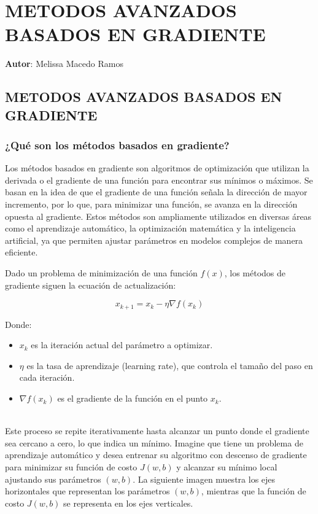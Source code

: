\documentclass{article}
\begin{document}
	\chapter{METODOS AVANZADOS BASADOS EN GRADIENTE}
	\textbf{Autor}: \large{Melissa Macedo Ramos}
	\label{chap:4}
	
	\vspace{1cm} 
	
	\section{METODOS AVANZADOS BASADOS EN GRADIENTE}
	
	\subsection{¿Qué son los métodos basados en gradiente?}
	
	Los métodos basados en gradiente son algoritmos de optimización que utilizan la derivada o el gradiente de una función para encontrar sus mínimos o máximos. Se basan en la idea de que el gradiente de una función señala la dirección de mayor incremento, por lo que, para minimizar una función, se avanza en la dirección opuesta al gradiente. Estos métodos son ampliamente utilizados en diversas áreas como el aprendizaje automático, la optimización matemática y la inteligencia artificial, ya que permiten ajustar parámetros en modelos complejos de manera eficiente.
	
	Dado un problema de minimización de una función \( f(x) \), los métodos de gradiente siguen la ecuación de actualización:
	
	\[
	x_{k+1} = x_k - \eta \nabla f(x_k)
	\]
	
	Donde:
	\begin{itemize}
		\item \( x_k \) es la iteración actual del parámetro a optimizar.
		\item \( \eta \) es la tasa de aprendizaje (learning rate), que controla el tamaño del paso en cada iteración.
		\item \( \nabla f(x_k) \) es el gradiente de la función en el punto \( x_k \).
	\end{itemize}
	\\
	Este proceso se repite iterativamente hasta alcanzar un punto donde el gradiente sea cercano a cero, lo que indica un mínimo.
    Imagine que tiene un problema de aprendizaje automático y desea entrenar su algoritmo con descenso de gradiente para minimizar su función de costo \( J(w, b) \) y alcanzar su mínimo local ajustando sus parámetros \( (w, b) \). La siguiente imagen muestra los ejes horizontales que representan los parámetros \( (w, b) \), mientras que la función de costo \( J(w, b) \) se representa en los ejes verticales.
\end{document}
